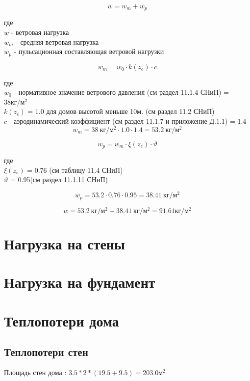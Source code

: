 \documentclass[10pt, twocolumn]{report}
\begin{document}
$$ w = w_m + w_p$$

где \\
\noindent
$w$ - ветровая нагрузка \\
$w_m$ - средняя ветровая нагрузка \\
$w_p$ - пульсационная составляющая ветровой нагрузки

$$w_m = w_0 \cdot k(z_e) \cdot c$$

где \\
\noindent
$w_0$ - нормативное значение ветрового давления (см раздел 11.1.4 СНиП) = $38 \text{кг}/\text{м}^2$ \\
$k(z_e)$ = 1.0 для домов высотой меньше 10м. (см раздел 11.2 СНиП) \\
$c$ - аэродинамический коэффициент (см раздел 11.1.7 и приложение Д.1.1) = 1.4 \\

$$w_m = 38\ \text{кг}/\text{м}^2 \cdot 1.0 \cdot 1.4 = 53.2\ \text{кг}/\text{м}^2$$

$$w_p = w_m \cdot \xi(z_e) \cdot \vartheta$$

где \\
\noindent
$\xi(z_e)$ = 0.76 (см таблицу 11.4 СНиП) \\
$\vartheta$ = 0.95(см раздел 11.1.11 СНиП) 

$$w_p = 53.2 \cdot 0.76 \cdot 0.95 = 38.41\ \text{кг}/\text{м}^2$$


$$w = 53.2\ \text{кг}/\text{м}^2 + 38.41\ \text{кг}/\text{м}^2 = 91.61 \text{кг}/\text{м}^2 $$


\chapter{Нагрузка на стены}

\chapter{Нагрузка на фундамент}

\chapter{Теплопотери дома}

\section{Теплопотери стен}

Площадь стен дома : $3.5 * 2 * (19.5 + 9.5) = 203.0 \text{м}^2$
\end{document}
